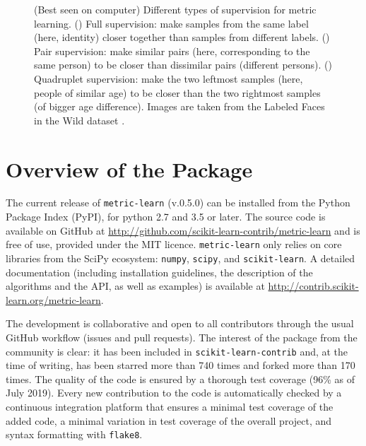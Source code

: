 \documentclass[twoside,11pt]{article}
\newcommand{\william}[1]{\todo[inline,caption={},color=blue!40]{{\it William:~}#1}}
\begin{document}
\begin{figure}[ht]
\begin{subfigure}[t]{0.40\textwidth}
    \end{subfigure}
    \caption{(Best seen on computer) Different types of supervision for metric learning. () Full supervision: make samples from the same label (here, identity) closer together than samples from different labels. () Pair supervision: make similar pairs (here, corresponding to the same person) to be closer than dissimilar pairs (different persons). () Quadruplet supervision: make the two leftmost samples (here, people of similar age) to be closer than the two rightmost samples (of bigger age difference). Images are taken from the Labeled Faces in the Wild dataset \citep{Huang12}.}\label{fig:flowers}
\end{figure}

\section{Overview of the Package}

The current release of \texttt{metric-learn} (v.0.5.0) can be installed from the Python Package Index (PyPI), for python 2.7 and 3.5 or later. The source code is available on GitHub at \url{http://github.com/scikit-learn-contrib/metric-learn} and is free of use, provided under the MIT licence. \texttt{metric-learn} only relies on core libraries from the SciPy ecosystem: \texttt{numpy}, \texttt{scipy}, and \texttt{scikit-learn}. A detailed documentation (including installation guidelines, the description of the algorithms and the API, as well as examples) is available at \url{http://contrib.scikit-learn.org/metric-learn}.

The development is collaborative and open to all contributors through the usual GitHub workflow (issues and pull requests). The interest of the package from the community is clear: it has been included in \texttt{scikit-learn-contrib} and, at the time of writing, has been starred more than 740 times and forked more than 170 times.
The quality of the code is ensured by a thorough test coverage (96\% as of July 2019). Every new contribution to the code is automatically checked by a continuous integration platform that ensures a minimal test coverage of the added code, a minimal variation in test coverage of the overall project, and syntax formatting with \texttt{flake8}. %
\william{a bit repetitive with introduction?}
\end{document}
